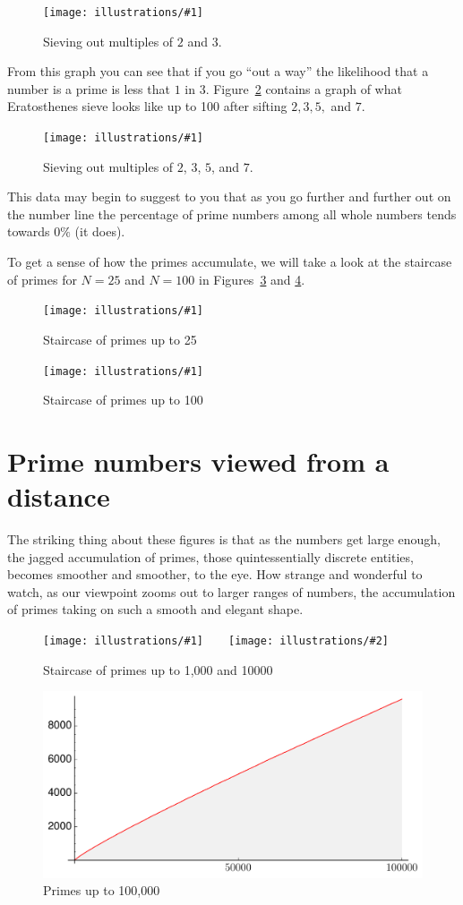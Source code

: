 \documentclass[11pt]{article}
\newcommand{\ill}[3]{ 
   \begin{figure}[H]
   \begin{center}
   \texttt{[image: illustrations/\#1]}
   \caption{#3}
   \end{center}
    \end{figure}
}
\newcommand{\illtwo}[4]{ 
   \begin{figure}[H]
   \begin{center}
   \texttt{[image: illustrations/\#1]}$\qquad$\texttt{[image: illustrations/\#2]}
   \caption{#4}
    \end{center}
    \end{figure}
}
\theoremstyle{plain}
\theoremstyle{definition}
\numberwithin{equation}{section}
\numberwithin{figure}{section}
\numberwithin{table}{section}
\begin{document}
\ill{sieves3_100}{.7}{Sieving out multiples of $2$ and $3$.\label{fig:sieve3_100}}


From this graph you can see that if you go ``out a way'' the
likelihood that a number is a prime is less that $1$ in $3
$. Figure~\ref{fig:sieve7_100} contains a graph of what Eratosthenes
sieve looks like up to 100 after sifting $2,3,5,$ and $7$.



\ill{sieves7_100}{.7}{Sieving out multiples of $2$, $3$, $5$, and $7$.\label{fig:sieve7_100}}


This data may begin to suggest to you that as you go further and
further out on the number line the percentage of prime numbers among
all whole numbers tends towards $0\%$ (it does).
  

To get a sense of how the primes accumulate, we will take a look at
the staircase of primes for $N= 25$ and $N=100$ in Figures~\ref{fig:staircase25}
and \ref{fig:staircase100a}.

\ill{prime_pi_25_aspect1}{.8}{Staircase of primes up to 25\label{fig:staircase25}}
\ill{prime_pi_100_aspect1}{.8}{Staircase of primes up to 100\label{fig:staircase100a}}

    
    
\section{Prime numbers viewed from a distance}
The striking thing about these figures is that as the numbers get
large enough, the jagged accumulation of primes, those
quintessentially discrete entities, becomes smoother and smoother, to
the eye. How strange and wonderful to watch, as our viewpoint zooms
out to larger ranges of numbers, the accumulation of primes taking on
such a smooth and elegant shape.

\illtwo{prime_pi_1000}{prime_pi_10000}{0.4}{Staircase of primes up to 1,000 and 10000\label{fig:staircases2}}

   \begin{figure}[H]
   \begin{center}
   \includegraphics[width=.8\textwidth]{illustrations/prime_pi_100000}
   \caption{Primes up to 100,000\label{fig:pn100000}}
   \end{center}
    \end{figure}
\end{document}
